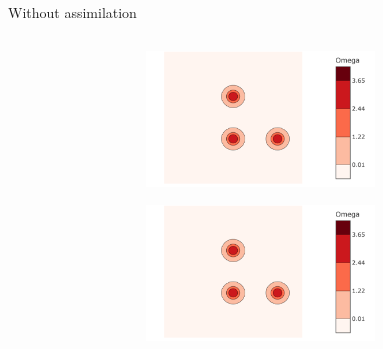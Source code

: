 \documentclass[aspectratio=169]{beamer} %
\begin{document}
\begin{frame}{Without assimilation}
    \begin{columns}
        \begin{column}{0.5\textwidth}
            \begin{figure}[t]
                \centering
            \end{figure}
        \end{column}
        \begin{column}{0.5\textwidth}
            \begin{figure}
                \centering
                \begin{subfigure}{\textwidth}
                    \centering
                    \includegraphics[width=0.8\textwidth]{images/vorticity_field.png}
                \end{subfigure}
                \begin{subfigure}{\textwidth}
                    \centering
                    \includegraphics[width=0.8\textwidth]{images/vorticity_field.png}
                \end{subfigure}
            \end{figure}
        \end{column}
    \end{columns}
\end{frame}
\end{document}

